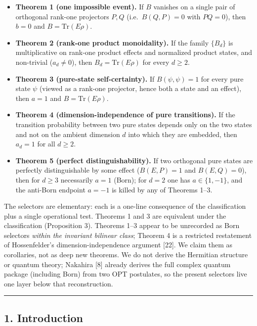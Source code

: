 \documentclass[
]{article}
\providecommand{\tightlist}{%
  \setlength{\itemsep}{0pt}\setlength{\parskip}{0pt}}
\begin{document}
\begin{itemize}
\tightlist
\item
  \textbf{Theorem 1 (one impossible event).} If \(B\) vanishes on a
  single pair of orthogonal rank-one projectors \(P,Q\)
  (i.e.~\(B(Q,P)=0\) with \(PQ=0\)), then \(b=0\) and
  \(B=\mathrm{Tr}(E\rho)\).
\item
  \textbf{Theorem 2 (rank-one product monoidality).} If the family
  \(\{B_d\}\) is multiplicative on rank-one product effects and
  normalized product states, and non-trivial (\(a_d\neq 0\)), then
  \(B_d=\mathrm{Tr}(E\rho)\) for every \(d\geq 2\).
\item
  \textbf{Theorem 3 (pure-state self-certainty).} If \(B(\psi,\psi)=1\)
  for every pure state \(\psi\) (viewed as a rank-one projector, hence
  both a state and an effect), then \(a=1\) and
  \(B=\mathrm{Tr}(E\rho)\).
\item
  \textbf{Theorem 4 (dimension-independence of pure transitions).} If
  the transition probability between two pure states depends only on the
  two states and not on the ambient dimension \(d\) into which they are
  embedded, then \(a_d=1\) for all \(d\geq 2\).
\item
  \textbf{Theorem 5 (perfect distinguishability).} If two orthogonal
  pure states are perfectly distinguishable by some effect (\(B(E,P)=1\)
  and \(B(E,Q)=0\)), then for \(d\geq 3\) necessarily \(a=1\) (Born);
  for \(d=2\) one has \(a\in\{1,-1\}\), and the anti-Born endpoint
  \(a=-1\) is killed by any of Theorems 1--3.
\end{itemize}

The selectors are elementary: each is a one-line consequence of the
classification plus a single operational test. Theorems 1 and 3 are
equivalent under the classification (Proposition 3). Theorems 1--3
appear to be unrecorded as Born selectors \emph{within the invariant
bilinear class}; Theorem 4 is a restricted restatement of Hossenfelder's
dimension-independence argument {[}22{]}. We claim them as corollaries,
not as deep new theorems. We do not derive the Hermitian structure or
quantum theory; Nakahira {[}8{]} already derives the full complex
quantum package (including Born) from two OPT postulates, so the present
selectors live one layer below that reconstruction.

\begin{center}\rule{0.5\linewidth}{0.5pt}\end{center}

\subsection{1. Introduction}\label{introduction}
\end{document}
